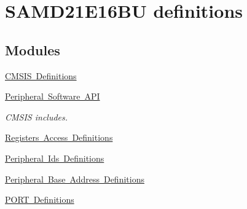 \hypertarget{group___s_a_m_d21_e16_b_u__definitions}{}\section{S\+A\+M\+D21\+E16\+BU definitions}
\label{group___s_a_m_d21_e16_b_u__definitions}
\subsection*{Modules}
\begin{DoxyCompactItemize}
\item 
\mbox{\hyperlink{group___s_a_m_d21_e16_b_u__cmsis}{C\+M\+S\+I\+S Definitions}}
\item 
\mbox{\hyperlink{group___s_a_m_d21_e16_b_u__api}{Peripheral Software A\+PI}}
\begin{DoxyCompactList}\small\item\em C\+M\+S\+IS includes. \end{DoxyCompactList}\item 
\mbox{\hyperlink{group___s_a_m_d21_e16_b_u__reg}{Registers Access Definitions}}
\item 
\mbox{\hyperlink{group___s_a_m_d21_e16_b_u__id}{Peripheral Ids Definitions}}
\item 
\mbox{\hyperlink{group___s_a_m_d21_e16_b_u__base}{Peripheral Base Address Definitions}}
\item 
\mbox{\hyperlink{group___s_a_m_d21_e16_b_u__port}{P\+O\+R\+T Definitions}}
\end{DoxyCompactItemize}
